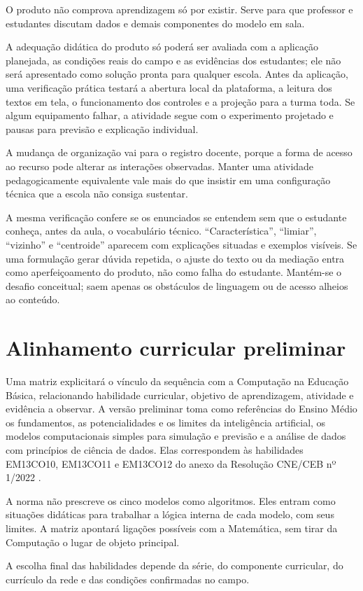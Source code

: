 O produto não comprova aprendizagem só por existir. Serve para que professor e estudantes discutam dados e demais componentes do modelo em sala.

A adequação didática do produto só poderá ser avaliada com a aplicação planejada, as condições reais do campo e as evidências dos estudantes; ele não será apresentado como solução pronta para qualquer escola. Antes da aplicação, uma verificação prática testará a abertura local da plataforma, a leitura dos textos em tela, o funcionamento dos controles e a projeção para a turma toda. Se algum equipamento falhar, a atividade segue com o experimento projetado e pausas para previsão e explicação individual.

A mudança de organização vai para o registro docente, porque a forma de acesso ao recurso pode alterar as interações observadas. Manter uma atividade pedagogicamente equivalente vale mais do que insistir em uma configuração técnica que a escola não consiga sustentar.

A mesma verificação confere se os enunciados se entendem sem que o estudante conheça, antes da aula, o vocabulário técnico. ``Característica'', ``limiar'', ``vizinho'' e ``centroide'' aparecem com explicações situadas e exemplos visíveis. Se uma formulação gerar dúvida repetida, o ajuste do texto ou da mediação entra como aperfeiçoamento do produto, não como falha do estudante. Mantém-se o desafio conceitual; saem apenas os obstáculos de linguagem ou de acesso alheios ao conteúdo.

\section{Alinhamento curricular preliminar}

Uma matriz explicitará o vínculo da sequência com a Computação na Educação Básica, relacionando habilidade curricular, objetivo de aprendizagem, atividade e evidência a observar. A versão preliminar toma como referências do Ensino Médio os fundamentos, as potencialidades e os limites da inteligência artificial, os modelos computacionais simples para simulação e previsão e a análise de dados com princípios de ciência de dados. Elas correspondem às habilidades EM13CO10, EM13CO11 e EM13CO12 do anexo da Resolução CNE/CEB nº 1/2022 \cite{brasil2022computacao}.

A norma não prescreve os cinco modelos como algoritmos. Eles entram como situações didáticas para trabalhar a lógica interna de cada modelo, com seus limites. A matriz apontará ligações possíveis com a Matemática, sem tirar da Computação o lugar de objeto principal.

A escolha final das habilidades depende da série, do componente curricular, do currículo da rede e das condições confirmadas no campo.
